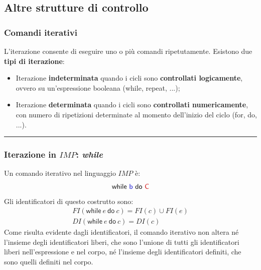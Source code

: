 \documentclass[a4paper]{article}
\newcommand{\longline}{\noindent\rule{\textwidth}{0.4pt}}
\begin{document}
 	\subsection{Altre strutture di controllo}
 	
 	\subsubsection{Comandi iterativi}
 	
 	L'iterazione consente di eseguire uno o più comandi ripetutamente. Esistono due \textbf{tipi di iterazione}:
 	\begin{itemize}
 		\item Iterazione \textcolor{Red3}{\textbf{indeterminata}} quando i cicli sono \textbf{controllati logicamente}, ovvero su un'espressione booleana (\textsf{while}, \textsf{repeat}, ...);
 		
 		\item Iterazione \textcolor{Red3}{\textbf{determinata}} quando i cicli sono \textbf{controllati numericamente}, con numero di ripetizioni determinate al momento dell'inizio del ciclo (\textsf{for}, \textsf{do}, ...).
 	\end{itemize}
 	
 	\longline
 	
 	\subsubsection{Iterazione in $IMP$: \emph{while}}
 	
 	Un comando iterativo nel linguaggio $IMP$ è:
 	\begin{equation*}
 		\textsf{while \textcolor{Blue3}{b} do \textcolor{Red3}{C}}
 	\end{equation*}
 	Gli identificatori di questo costrutto sono:
 	\begin{gather*}
 		FI\left(\mathsf{while} \: e \: \mathsf{do} \: c\right) = FI\left(c\right) \cup FI\left(e\right) \\
 		DI\left(\mathsf{while} \: e \: \mathsf{do} \: c\right) = DI\left(c\right)
 	\end{gather*}
 	Come risulta evidente dagli identificatori, il comando iterativo non altera né l'insieme degli identificatori liberi, che sono l'unione di tutti gli identificatori liberi nell'espressione e nel corpo, né l'insieme degli identificatori definiti, che sono quelli definiti nel corpo.\newline
 	
\end{document}
